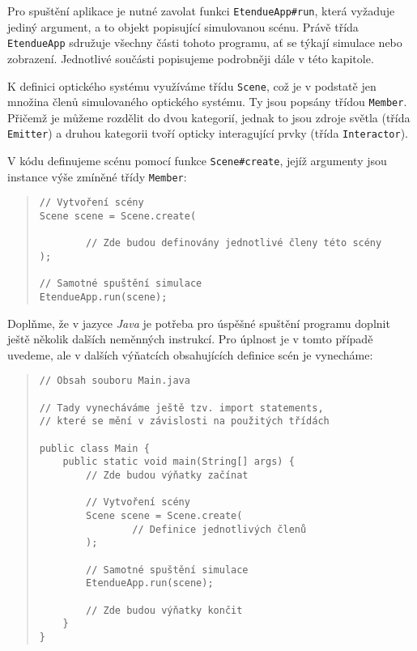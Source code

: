 Pro spuštění aplikace je nutné zavolat funkci \texttt{EtendueApp\#run}, která vyžaduje jediný argument, a to objekt popisující simulovanou scénu. Právě třída \texttt{EtendueApp} sdružuje všechny části tohoto programu, ať se týkají simulace nebo zobrazení. Jednotlivé součásti popisujeme podrobněji dále v této kapitole.

K definici optického systému využíváme třídu \texttt{Scene}, což je v podstatě jen množina členů simulovaného optického systému. Ty jsou popsány třídou \texttt{Member}. Přičemž je můžeme rozdělit do dvou kategorií, jednak to jsou zdroje světla (třída \texttt{Emitter}) a druhou kategorii tvoří opticky interagující prvky (třída \texttt{Interactor}).

V kódu definujeme scénu pomocí funkce \texttt{Scene\#create}, jejíž argumenty jsou instance výše zmíněné třídy \texttt{Member}:

\begin{minipage}{\textwidth}\begin{quote}\begin{lstlisting}
// Vytvoření scény
Scene scene = Scene.create(

        // Zde budou definovány jednotlivé členy této scény
);

// Samotné spuštění simulace
EtendueApp.run(scene);
\end{lstlisting}\end{quote}\end{minipage}

Doplňme, že v jazyce \emph{Java} je potřeba pro úspěšné spuštění programu doplnit ještě několik dalších neměnných instrukcí. Pro úplnost je v tomto případě uvedeme, ale v dalších výňatcích obsahujících definice scén je vynecháme:

\begin{minipage}{\textwidth}\begin{quote}\begin{lstlisting}
// Obsah souboru Main.java

// Tady vynecháváme ještě tzv. import statements,
// které se mění v závislosti na použitých třídách

public class Main {
    public static void main(String[] args) {
        // Zde budou výňatky začínat

        // Vytvoření scény
        Scene scene = Scene.create(
                // Definice jednotlivých členů
        );

        // Samotné spuštění simulace
        EtendueApp.run(scene);

        // Zde budou výňatky končit
    }
}
\end{lstlisting}\end{quote}\end{minipage}

